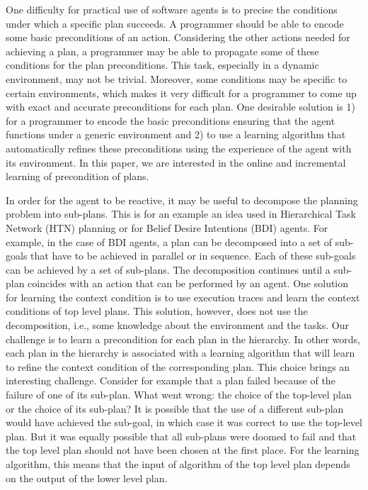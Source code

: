 \documentclass{article}
\begin{document}
One difficulty for practical use of software agents is to 
precise the
conditions under which a specific plan succeeds. A programmer should
be able to encode some basic preconditions of an action. Considering
the other actions needed for achieving a plan, a programmer may be
able to propagate some of these conditions for the plan preconditions.
This task, especially in a dynamic environment, may not be
trivial. Moreover, some conditions may be specific to certain
environments, which makes it very difficult for a programmer to come
up with exact and accurate preconditions for each plan.  One desirable
solution is 1) for a programmer to encode the basic preconditions
ensuring that the agent functions under a generic environment and 2)
to use a learning algorithm that automatically refines these
preconditions using the experience of the agent with its
environment. In this paper, we are interested in the online and
incremental learning of precondition of plans.

In order for the agent to be reactive, it may be useful to decompose the planning problem into sub-plans. This is for an example an idea used in Hierarchical Task Network (HTN) planning or for Belief Desire Intentions (BDI) agents.  For example, in the case of BDI agents, a plan can be decomposed into a set of sub-goals that have to be achieved in parallel or in sequence. Each of these sub-goals can be achieved by a set of sub-plans. The decomposition continues until a sub-plan coincides with an action that can be performed by an agent. One solution for learning the context condition is to use execution traces and learn the context conditions of top level plans. This solution, however, does not use the decomposition, i.e., some knowledge about the environment and the tasks. Our challenge is to learn a precondition for each plan in the hierarchy.  In other words, each plan in the hierarchy is associated with a learning algorithm that will learn to refine the context condition of the corresponding plan. This choice brings an interesting challenge. Consider for example that a plan failed because of the failure of one of its sub-plan. What went wrong: the choice of the top-level plan or the choice of its sub-plan?  It is possible that the use of a different sub-plan would have achieved the sub-goal, in which case it was correct to use the top-level plan. But it was equally possible that all sub-plans were doomed to fail and that the top level plan should not have been chosen at the first place.  For the learning algorithm, this means that the input of algorithm of the top level plan depends on the output of the lower level plan. 
\end{document}
